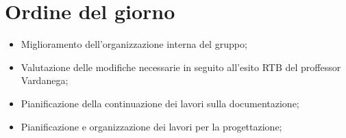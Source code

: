

\section{Ordine del giorno}

\begin{itemize}
    \item Miglioramento dell'organizzazione interna del gruppo;
    \item Valutazione delle modifiche necessarie in seguito all'esito RTB del proffessor Vardanega;
    \item Pianificazione della continuazione dei lavori sulla documentazione;
    \item Pianificazione e organizzazione dei lavori per la progettazione;
\end{itemize}
